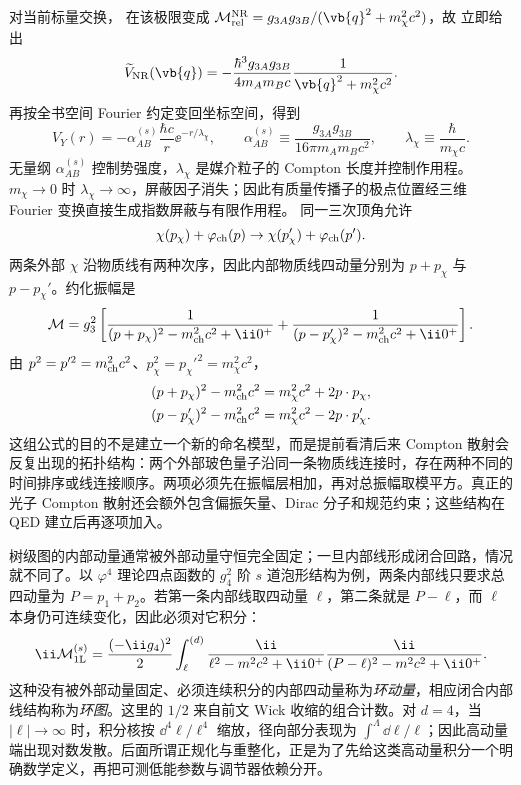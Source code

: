 对当前标量交换， 在该极限变成
$\mathcal M_{\rm rel}^{\rm NR}=g_{3A}g_{3B}/(\vb{q}^2+m_\chi^2c^2)$，故 立即给出
\begin{equation}
 {
 \widetilde V_{\rm NR}(\vb{q})
 =-\frac{\hbar^3g_{3A}g_{3B}}{4m_A m_Bc}
 \frac{1}{\vb{q}^2+m_\chi^2c^2}.}
 \label{eq:scalar-yukawa-momentum-kernel-dp68}
\end{equation}
再按全书空间 Fourier 约定变回坐标空间，得到
\begin{equation}
 {
 V_Y(r)=-\alpha_{AB}^{(s)}\frac{\hbar c}{r}\ee^{-r/\lambda_\chi},
 \qquad
 \alpha_{AB}^{(s)}\equiv\frac{g_{3A}g_{3B}}{16\pi m_A m_Bc^2},
 \qquad
 \lambda_\chi\equiv\frac{\hbar}{m_\chi c}.}
 \label{eq:scalar-yukawa-potential-dp49}
\end{equation}
无量纲 $\alpha_{AB}^{(s)}$ 控制势强度，$\lambda_\chi$ 是媒介粒子的 Compton 长度并控制作用程。$m_\chi\to0$ 时 $\lambda_\chi\to\infty$，屏蔽因子消失；因此有质量传播子的极点位置经三维 Fourier 变换直接生成指数屏蔽与有限作用程。
同一三次顶角允许
\begin{equation*}
 \chi(p_\chi)+\varphi_{\rm ch}(p)\to\chi(p_\chi')+\varphi_{\rm ch}(p').
\end{equation*}
两条外部 $\chi$ 沿物质线有两种次序，因此内部物质线四动量分别为 $p+p_\chi$ 与 $p-p_\chi'$。约化振幅是
\begin{equation}
 {
 \mathcal M
 =g_3^2\left[
 \frac1{(p+p_\chi)^2-m_{\rm ch}^2c^2+\ii0^+}
 +\frac1{(p-p_\chi')^2-m_{\rm ch}^2c^2+\ii0^+}
 \right].}
 \label{eq:scalar-compton-analogue-si-r10}
\end{equation}
由 $p^2=p'^2=m_{\rm ch}^2c^2$、$p_\chi^2=p_\chi'^2=m_\chi^2c^2$，
\begin{align*}
 (p+p_\chi)^2-m_{\rm ch}^2c^2&=m_\chi^2c^2+2p\cdot p_\chi,\\
 (p-p_\chi')^2-m_{\rm ch}^2c^2&=m_\chi^2c^2-2p\cdot p_\chi'.
\end{align*}
这组公式的目的不是建立一个新的命名模型，而是提前看清后来 Compton 散射会反复出现的拓扑结构：两个外部玻色量子沿同一条物质线连接时，存在两种不同的时间排序或线连接顺序。两项必须先在振幅层相加，再对总振幅取模平方。真正的光子 Compton 散射还会额外包含偏振矢量、Dirac 分子和规范约束；这些结构在 QED 建立后再逐项加入。

树级图的内部动量通常被外部动量守恒完全固定；一旦内部线形成闭合回路，情况就不同了。以 $\varphi^4$ 理论四点函数的 $g_4^2$ 阶 $s$ 道泡形结构为例，两条内部线只要求总四动量为 $P=p_1+p_2$。若第一条内部线取四动量 $\ell$，第二条就是 $P-\ell$，而 $\ell$ 本身仍可连续变化，因此必须对它积分：
\begin{equation}
 \ii\mathcal M_{\rm 1L}^{(s)}
 =
 \frac{(-\ii g_4)^2}{2}
 \int_{\ell}^{(d)}
 \frac{\ii}{\ell^2-m^2c^2+\ii0^+}
 \frac{\ii}{(P-\ell)^2-m^2c^2+\ii0^+}.
 \label{eq:phi4-bubble-toy-r12}
\end{equation}
这种没有被外部动量固定、必须连续积分的内部四动量称为\emph{环动量}，相应闭合内部线结构称为\emph{环图}。这里的 $1/2$ 来自前文 Wick 收缩的组合计数。对 $d=4$，当 $|\ell|\to\infty$ 时，积分核按 $\dd^4 \ell/\ell^4$ 缩放，径向部分表现为 $\int^{\Lambda}\dd\ell/\ell$；因此高动量端出现对数发散。后面所谓正规化与重整化，正是为了先给这类高动量积分一个明确数学定义，再把可测低能参数与调节器依赖分开。

